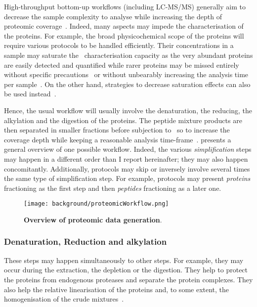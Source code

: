 High-throughput bottom-up workflows (including \gls{LC-MS/MS}) generally
aim to decrease the sample complexity to analyse while increasing the depth
of proteomic coverage~. Indeed,
many aspects may impede the characterisation of the proteins.
For example, the broad physicochemical scope of the proteins will
require various protocols to be handled efficiently.
Their concentrations in a sample may saturate the \ms\ characterisation capacity
as the very abundant proteins are easily detected and quantified while rarer
proteins may be missed entirely without specific precautions~ or without unbearably increasing the
analysis time per sample~.
On the other hand, strategies to decrease saturation effects can also be used
instead~.

Hence, the usual workflow will usually involve the denaturation, the reducing,
the alkylation and the digestion of the proteins. The peptide mixture products
are then separated in smaller fractions before subjection to \ms\ so to increase
the coverage depth
while keeping a reasonable analysis time-frame~.
 presents a general overview of one possible workflow.
Indeed, the various \emph{simplification} steps may happen in a different order
than I report hereinafter; they may also happen concomitantly. Additionally,
protocols may skip or inversely involve several times the same type of
simplification step. For example, protocols may present
\emph{proteins} fractioning as the first step
and then \emph{peptides} fractioning as a later one.

\begin{figure}[!htpb]
    \texttt{[image: background/proteomicWorkflow.png]}\centering
    \caption[Overview of proteomic data generation]{\label{fig:proteomics}%
    \textbf{Overview of proteomic data generation}.}
\end{figure}

\subsubsection{Denaturation, Reduction and alkylation}

These steps may happen simultaneously to other steps. For example, they may
occur during the extraction, the depletion or the digestion. They help to protect
the proteins from endogenous proteases and separate the protein complexes. They
also help the relative linearisation of the proteins and, to some extent,
the homogenisation of the crude mixtures~.

